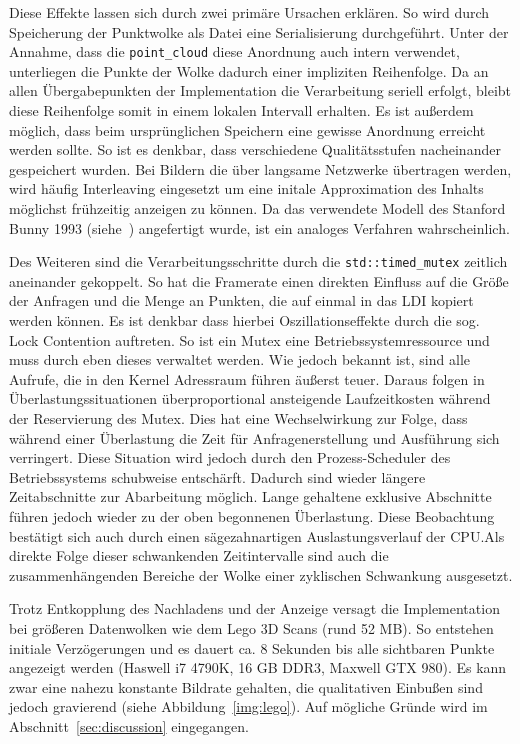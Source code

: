 \documentclass[hyperref, beleg, german]{cgvpub}
\begin{document}
Diese Effekte lassen sich durch zwei primäre Ursachen erklären. So wird durch
Speicherung der Punktwolke als Datei eine Serialisierung durchgeführt. Unter
der Annahme, dass die \texttt{point\_cloud} diese Anordnung auch intern
verwendet, unterliegen die Punkte der Wolke dadurch einer impliziten
Reihenfolge. Da an allen Übergabepunkten der Implementation die Verarbeitung
seriell erfolgt, bleibt diese Reihenfolge somit in einem lokalen Intervall
erhalten. Es ist außerdem möglich, dass beim ursprünglichen Speichern eine
gewisse Anordnung erreicht werden sollte. So ist es denkbar, dass verschiedene
Qualitätsstufen nacheinander gespeichert wurden. Bei Bildern die über langsame
Netzwerke übertragen werden, wird häufig Interleaving eingesetzt um eine
initale Approximation des Inhalts möglichst frühzeitig anzeigen zu können. Da
das verwendete Modell des Stanford Bunny 1993 (siehe~\cite{bunny}) angefertigt
wurde, ist ein analoges Verfahren wahrscheinlich.

Des Weiteren sind die Verarbeitungsschritte durch die
\texttt{std::timed\_mutex} zeitlich aneinander gekoppelt. So hat die Framerate
einen direkten Einfluss auf die Größe der Anfragen und die Menge an Punkten,
die auf einmal in das LDI kopiert werden können. Es ist denkbar dass hierbei
Oszillationseffekte durch die sog. Lock Contention auftreten. So ist ein Mutex
eine Betriebssystemressource und muss durch eben dieses verwaltet werden. Wie
jedoch bekannt ist, sind alle Aufrufe, die in den Kernel Adressraum führen
äußerst teuer. Daraus folgen in Überlastungssituationen überproportional
ansteigende Laufzeitkosten während der Reservierung des Mutex. Dies hat eine
Wechselwirkung zur Folge, dass während einer Überlastung die Zeit für
Anfragenerstellung und Ausführung sich verringert. Diese Situation wird jedoch
durch den Prozess-Scheduler des Betriebssystems schubweise entschärft. Dadurch
sind wieder längere Zeitabschnitte zur Abarbeitung möglich. Lange gehaltene
exklusive Abschnitte führen jedoch wieder zu der oben begonnenen Überlastung.
Diese Beobachtung bestätigt sich auch durch einen sägezahnartigen
Auslastungsverlauf der CPU.\@ Als direkte Folge dieser schwankenden
Zeitintervalle sind auch die zusammenhängenden Bereiche der Wolke einer
zyklischen Schwankung ausgesetzt.

Trotz Entkopplung des Nachladens und der Anzeige versagt die Implementation bei
größeren Datenwolken wie dem Lego 3D Scans (rund 52 MB). So entstehen initiale
Verzögerungen und es dauert ca. 8 Sekunden bis alle sichtbaren Punkte angezeigt
werden (Haswell i7 4790K, 16 GB DDR3, Maxwell GTX 980). Es kann zwar eine
nahezu konstante Bildrate gehalten, die qualitativen Einbußen sind jedoch
gravierend (siehe Abbildung~\ref{img:lego}). Auf mögliche Gründe wird im
Abschnitt~\ref{sec:discussion} eingegangen.
\end{document}
